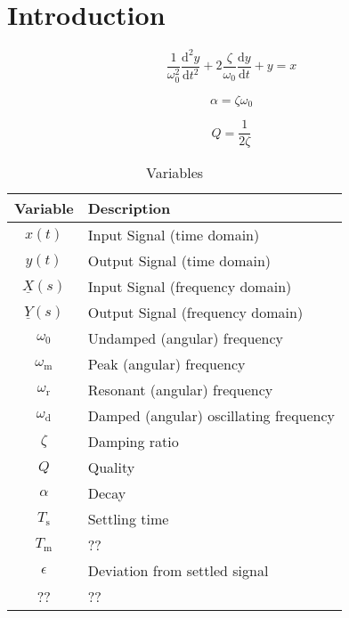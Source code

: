 \documentclass{article}[11pt]
\begin{document}
\notetitle

\section{Introduction}

\begin{equation}
\frac{1}{\omega_0^2} \frac{\mathrm{d}^2y}{\mathrm{d}t^2} + 2\frac{\zeta}{\omega_0}\frac{\mathrm{d}y}{\mathrm{d}t} + y = x
\end{equation}

\begin{equation}
\alpha = \zeta \omega_0
\end{equation}

\begin{equation}
Q =\frac{1}{2\zeta}
\end{equation}

\begin{table}[H]
\centering
\caption{Variables}
\begin{tabular}{cl}
\toprule
Variable              & Description                            \\ \midrule
$x(t)$                & Input Signal (time domain)             \\ 
$y(t)$                & Output Signal (time domain)            \\ 
$\underline{X}(s)$    & Input Signal (frequency domain)        \\ 
$\underline{Y}(s)$    & Output Signal (frequency domain)       \\
$\omega_0$            & Undamped (angular) frequency           \\
$\omega_{\mathrm{m}}$ & Peak (angular) frequency               \\
$\omega_{\mathrm{r}}$ & Resonant (angular) frequency           \\
$\omega_{\mathrm{d}}$ & Damped (angular) oscillating frequency \\
$\zeta$               & Damping ratio                          \\
$Q$                   & Quality                                \\
$\alpha$              & Decay                                  \\ 
$T_{\mathrm{s}}$      & Settling time                          \\
$T_{\mathrm{m}}$      & ??                                     \\ 
$\epsilon$            & Deviation from settled signal          \\
??                    & ??                                     \\ \toprule
\end{tabular}
\label{tab:variables}
\end{table}
\end{document}
